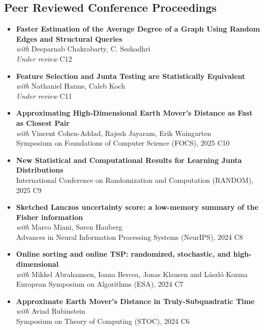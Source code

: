 \documentclass[paper=a4,fontsize=11pt]{article} %
\begin{document}
\subsection*{Peer Reviewed Conference Proceedings}
\begin{itemize}[leftmargin=0.5em,itemsep=0.3em,label={}]
    \item \textbf{Faster Estimation of the Average Degree of a Graph Using Random Edges and Structural Queries}\\ 
  \textit{with} Deeparnab Chakrabarty, C. Seshadhri \\
\textit{Under review} \hfill C12

    \item \textbf{Feature Selection and Junta Testing are Statistically Equivalent}\\ 
  \textit{with} Nathaniel Harms, Caleb Koch  \\
\textit{Under review} \hfill C11

    \item \textbf{Approximating High-Dimensional Earth Mover's Distance as Fast as Closest Pair}\\ 
  \textit{with} Vincent Cohen-Addad, Rajesh Jayaram, Erik Waingarten \\
    Symposium on Foundations of Computer Science (FOCS), 2025 \hfill C10
    
    \item \textbf{New Statistical and Computational Results for Learning Junta Distributions}\\ 
    International Conference on Randomization and Computation (RANDOM), 2025 \hfill C9
    
    \item \textbf{Sketched Lanczos uncertainty score: a low-memory summary of the Fisher information}\\ 
  \textit{with} Marco Miani, Søren Hauberg \\
    Advances in Neural Information Processing Systems (NeurIPS), 2024 \hfill C8

    \item \textbf{Online sorting and online TSP: randomized, stochastic, and high-dimensional}\\ 
    \textit{with} Mikkel Abrahamsen, Ioana Bercea, Jonas Klausen and László Kozma \\
    European Symposium on Algorithms (ESA), 2024 \hfill C7
    
    \item \textbf{Approximate Earth Mover's Distance in Truly-Subquadratic Time} \\ 
    \textit{with} Aviad Rubinstein \\
    Symposium on Theory of Computing (STOC), 2024 \hfill C6
    

\end{itemize}
\end{document}
